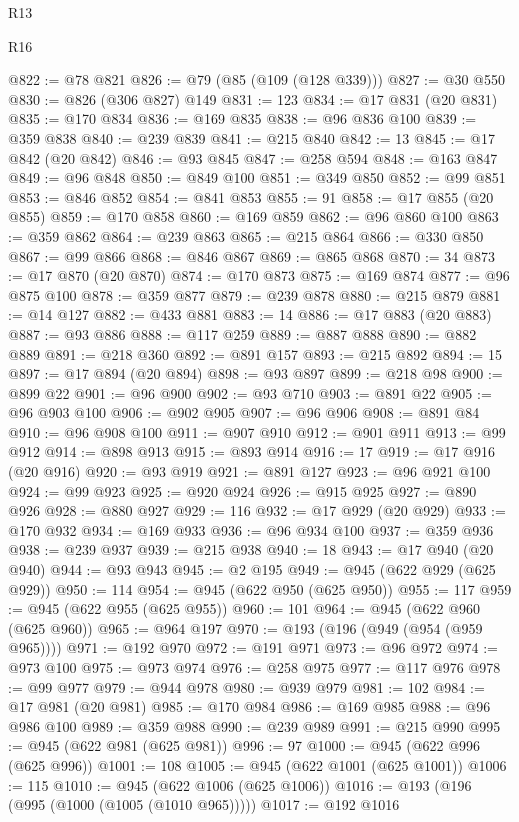 \begin{lexlean}{R13}
\begin{lexlean}{R16}
\begin{coremodule}
{{{{{{{{{{{{{{{{{{{{{{{{{{{{{{{{{{{{{{{{{{{{{{{{{{{{{{{{{{{{{{{{{{{{{{{{{{{{{{{{{{{{{{{{{{{{{{{{{{{{{{{{{{{{{{{{{@822 := @78 @821
@826 := @79 (@85 (@109 (@128 @339)))
@827 := @30 @550
@830 := @826 (@306 @827) @149
@831 := 123
@834 := @17 @831 (@20 @831)
@835 := @170 @834
@836 := @169 @835
@838 := @96 @836 @100
@839 := @359 @838
@840 := @239 @839
@841 := @215 @840
@842 := 13
@845 := @17 @842 (@20 @842)
@846 := @93 @845
@847 := @258 @594
@848 := @163 @847
@849 := @96 @848
@850 := @849 @100
@851 := @349 @850
@852 := @99 @851
@853 := @846 @852
@854 := @841 @853
@855 := 91
@858 := @17 @855 (@20 @855)
@859 := @170 @858
@860 := @169 @859
@862 := @96 @860 @100
@863 := @359 @862
@864 := @239 @863
@865 := @215 @864
@866 := @330 @850
@867 := @99 @866
@868 := @846 @867
@869 := @865 @868
@870 := 34
@873 := @17 @870 (@20 @870)
@874 := @170 @873
@875 := @169 @874
@877 := @96 @875 @100
@878 := @359 @877
@879 := @239 @878
@880 := @215 @879
@881 := @14 @127
@882 := @433 @881
@883 := 14
@886 := @17 @883 (@20 @883)
@887 := @93 @886
@888 := @117 @259
@889 := @887 @888
@890 := @882 @889
@891 := @218 @360
@892 := @891 @157
@893 := @215 @892
@894 := 15
@897 := @17 @894 (@20 @894)
@898 := @93 @897
@899 := @218 @98
@900 := @899 @22
@901 := @96 @900
@902 := @93 @710
@903 := @891 @22
@905 := @96 @903 @100
@906 := @902 @905
@907 := @96 @906
@908 := @891 @84
@910 := @96 @908 @100
@911 := @907 @910
@912 := @901 @911
@913 := @99 @912
@914 := @898 @913
@915 := @893 @914
@916 := 17
@919 := @17 @916 (@20 @916)
@920 := @93 @919
@921 := @891 @127
@923 := @96 @921 @100
@924 := @99 @923
@925 := @920 @924
@926 := @915 @925
@927 := @890 @926
@928 := @880 @927
@929 := 116
@932 := @17 @929 (@20 @929)
@933 := @170 @932
@934 := @169 @933
@936 := @96 @934 @100
@937 := @359 @936
@938 := @239 @937
@939 := @215 @938
@940 := 18
@943 := @17 @940 (@20 @940)
@944 := @93 @943
@945 := @2 @195
@949 := @945 (@622 @929 (@625 @929))
@950 := 114
@954 := @945 (@622 @950 (@625 @950))
@955 := 117
@959 := @945 (@622 @955 (@625 @955))
@960 := 101
@964 := @945 (@622 @960 (@625 @960))
@965 := @964 @197
@970 := @193 (@196 (@949 (@954 (@959 @965))))
@971 := @192 @970
@972 := @191 @971
@973 := @96 @972
@974 := @973 @100
@975 := @973 @974
@976 := @258 @975
@977 := @117 @976
@978 := @99 @977
@979 := @944 @978
@980 := @939 @979
@981 := 102
@984 := @17 @981 (@20 @981)
@985 := @170 @984
@986 := @169 @985
@988 := @96 @986 @100
@989 := @359 @988
@990 := @239 @989
@991 := @215 @990
@995 := @945 (@622 @981 (@625 @981))
@996 := 97
@1000 := @945 (@622 @996 (@625 @996))
@1001 := 108
@1005 := @945 (@622 @1001 (@625 @1001))
@1006 := 115
@1010 := @945 (@622 @1006 (@625 @1006))
@1016 := @193 (@196 (@995 (@1000 (@1005 (@1010 @965)))))
@1017 := @192 @1016
}}}}}}}}}}}}}}}}}}}}}}}}}}}}}}}}}}}}}}}}}}}}}}}}}}}}}}}}}}}}}}}}}}}}}}}}}}}}}}}}}}}}}}}}}}}}}}}}}}}}}}}}}}}}}}}}}
\end{coremodule}
\end{lexlean}
\end{lexlean}
